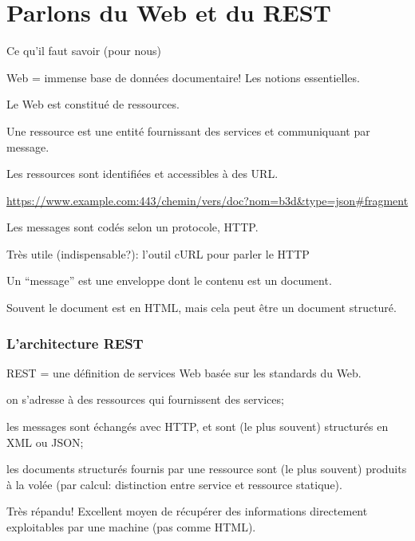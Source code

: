 

\section{Parlons du Web et du REST}


\begin{frame}{Ce qu'il faut savoir (pour nous)}


Web = immense base de données documentaire! Les notions
essentielles.

\begin{redbullet}

  \item Le Web est constitué de \alert{ressources}.

    Une ressource est une entité fournissant des services et communiquant
    par message.
    
   
   \item Les ressources sont identifiées et accessibles à des \alert{URL}.
   
   \url{https://www.example.com:443/chemin/vers/doc?nom=b3d&type=json\#fragment}


   \item Les messages sont codés selon un \alert{protocole}, HTTP.
   
   
   Très utile (indispensable?): l'outil cURL pour parler le HTTP

   \item Un ``message'' est une enveloppe dont le contenu est un \alert{document}.
   
   Souvent le document est en HTML,  mais cela peut être un \alert{document structuré}.

\end{redbullet}

\end{frame}


\begin{frame}[fragile]
\frametitle{L'architecture REST}

REST = une définition de services Web basée sur les standards du Web.

\begin{redbullet}
  \item on s'adresse à des ressources qui fournissent des services;
  \item les messages sont échangés avec HTTP, et sont (le plus souvent) \alert{structurés} en XML ou JSON;
  \item les documents structurés fournis par une ressource sont (le plus souvent)
     produits \alert{à la volée} (par \alert{calcul}: distinction entre service et ressource statique).
\end{redbullet}

Très répandu! Excellent moyen de récupérer des informations directement exploitables
par une machine (pas comme HTML).
\end{frame}

